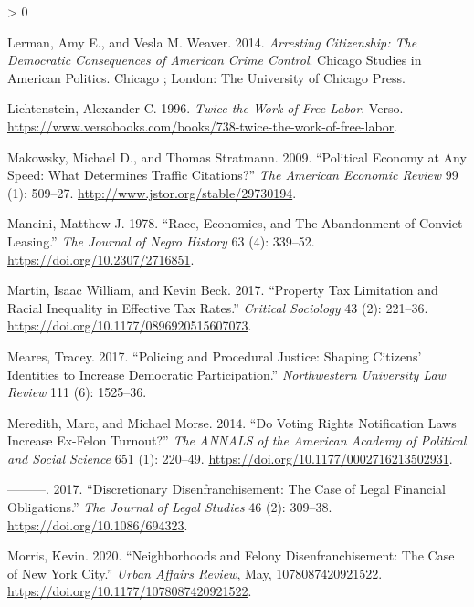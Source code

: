 \documentclass[
  12pt,
]{article}
\newlength{\cslhangindent}
\newenvironment{CSLReferences}[2] %
 {%
  \setlength{\parindent}{0pt}
  \ifodd #1 \everypar{\setlength{\hangindent}{\cslhangindent}}\ignorespaces\fi
  \ifnum #2 > 0
  \setlength{\parskip}{#2\baselineskip}
  \fi
 }%
 {}
\begin{document}
\begin{CSLReferences}{1}{0}
\leavevmode\hypertarget{ref-Lerman2014}{}%
Lerman, Amy E., and Vesla M. Weaver. 2014. \emph{Arresting Citizenship: The Democratic Consequences of {American} Crime Control}. Chicago Studies in {American} Politics. {Chicago ; London}: {The University of Chicago Press}.

\leavevmode\hypertarget{ref-Lichtenstein1996}{}%
Lichtenstein, Alexander C. 1996. \emph{Twice the {Work} of {Free Labor}}. {Verso}. \url{https://www.versobooks.com/books/738-twice-the-work-of-free-labor}.

\leavevmode\hypertarget{ref-Makowsky2009}{}%
Makowsky, Michael D., and Thomas Stratmann. 2009. {``Political {Economy} at {Any Speed}: {What Determines Traffic Citations}?''} \emph{The American Economic Review} 99 (1): 509--27. \url{http://www.jstor.org/stable/29730194}.

\leavevmode\hypertarget{ref-Mancini1978}{}%
Mancini, Matthew J. 1978. {``Race, {Economics}, and {The Abandonment} of {Convict Leasing}.''} \emph{The Journal of Negro History} 63 (4): 339--52. \url{https://doi.org/10.2307/2716851}.

\leavevmode\hypertarget{ref-Martin2017}{}%
Martin, Isaac William, and Kevin Beck. 2017. {``Property {Tax Limitation} and {Racial Inequality} in {Effective Tax Rates}.''} \emph{Critical Sociology} 43 (2): 221--36. \url{https://doi.org/10.1177/0896920515607073}.

\leavevmode\hypertarget{ref-Meares2017}{}%
Meares, Tracey. 2017. {``Policing and {Procedural Justice}: {Shaping Citizens}' {Identities} to {Increase Democratic Participation}.''} \emph{Northwestern University Law Review} 111 (6): 1525--36.

\leavevmode\hypertarget{ref-Meredith2014}{}%
Meredith, Marc, and Michael Morse. 2014. {``Do {Voting Rights Notification Laws Increase Ex}-{Felon Turnout}?''} \emph{The ANNALS of the American Academy of Political and Social Science} 651 (1): 220--49. \url{https://doi.org/10.1177/0002716213502931}.

\leavevmode\hypertarget{ref-Meredith2017}{}%
---------. 2017. {``Discretionary {Disenfranchisement}: {The Case} of {Legal Financial Obligations}.''} \emph{The Journal of Legal Studies} 46 (2): 309--38. \url{https://doi.org/10.1086/694323}.

\leavevmode\hypertarget{ref-Morris2020}{}%
Morris, Kevin. 2020. {``Neighborhoods and {Felony Disenfranchisement}: {The Case} of {New York City}.''} \emph{Urban Affairs Review}, May, 1078087420921522. \url{https://doi.org/10.1177/1078087420921522}.


\end{CSLReferences}
\end{document}
